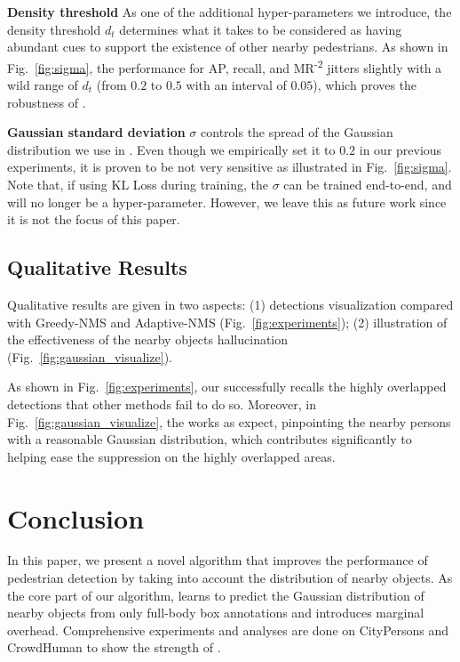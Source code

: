 \documentclass[sigconf]{acmart}
\begin{document}
\textbf{Density threshold} As one of the additional hyper-parameters we introduce, the density threshold $d_t$ determines what it takes to be considered as having abundant cues to support the existence of other nearby pedestrians. As shown in Fig.~\ref{fig:sigma}, the performance for AP, recall, and MR\textsuperscript{-2} jitters slightly with a wild range of $d_t$ (from $0.2$ to $0.5$ with an interval of $0.05$), which proves the robustness of \nmsname{}.

\textbf{Gaussian standard deviation} $\sigma$ controls the spread of the Gaussian distribution we use in \heatmapnameshort{}. Even though we empirically set it to $0.2$ in our previous experiments, it is proven to be not very sensitive as illustrated in Fig.~\ref{fig:sigma}. Note that, if using KL Loss during training, the $\sigma$ can be trained end-to-end, and will no longer be a hyper-parameter. However, we leave this as future work since it is not the focus of this paper.

\subsection{Qualitative Results}
\label{sec:qualitative}
Qualitative results are given in two aspects: (1) detections visualization compared with Greedy-NMS and Adaptive-NMS (Fig.~\ref{fig:experiments}); (2) illustration of the effectiveness of the nearby objects hallucination (Fig.~\ref{fig:gaussian_visualize}).

As shown in Fig.~\ref{fig:experiments}, our \nmsname{} successfully recalls the highly overlapped detections that other methods fail to do so. Moreover, in Fig.~\ref{fig:gaussian_visualize}, the \heatmapname{} works as expect, pinpointing the nearby persons with a reasonable Gaussian distribution, which contributes significantly to helping \nmsname{} ease the suppression on the highly overlapped areas.

\section{Conclusion}


In this paper, we present a novel \nmsname{} algorithm that improves the performance of pedestrian detection by taking into account the distribution of nearby objects. As the core part of our algorithm, \heatmapname{} learns to predict the Gaussian distribution of nearby objects from only full-body box annotations and introduces marginal overhead. Comprehensive experiments and analyses are done on CityPersons \cite{citypersons} and CrowdHuman \cite{crowdhuman} to show the strength of \nmsname{}.
\end{document}
